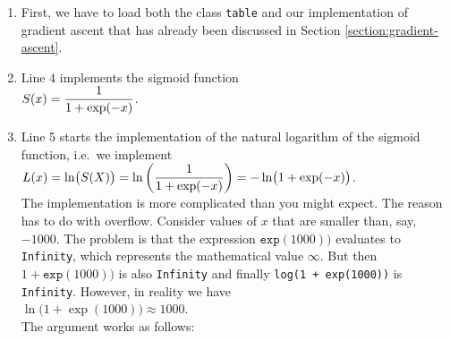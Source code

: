 \begin{enumerate}
\item First, we have to load both the class \texttt{table} and our implementation of gradient ascent 
      that has already been discussed in Section \ref{section:gradient-ascent}.
\item Line 4 implements the sigmoid function
      \\[0.2cm]
      \hspace*{1.3cm}
      $\displaystyle S(x) = \frac{1}{1 + \exp(-x)}$.
\item Line 5 starts the implementation of the natural logarithm of the sigmoid function, i.e.~we implement
      \\[0.2cm]
      \hspace*{1.3cm}
      $\displaystyle L(x) = \ln\bigl(S(X)\bigr) = \ln\left(\frac{1}{1 + \exp(-x)}\right) =- \ln\bigl(1 + \exp(-x)\bigr)$.
      \\[0.2cm]
      The implementation is more complicated than you might expect.  The reason has to do with
      overflow.  Consider values of $x$ that are smaller than, say, $-1000$.  The problem is that
      the expression $\mathtt{exp}(1000))$ evaluates to \texttt{Infinity}, which represents the
      mathematical value $\infty$.  But then $1 + \mathtt{exp}(1000))$ is also \texttt{Infinity} and
      finally \texttt{log(1 + exp(1000))} is \texttt{Infinity}.  However, in reality we have
      \\[0.2cm]
      \hspace*{1.3cm}
      $\ln\bigl(1 + \exp(1000)\bigr) \approx 1000$.
      \\[0.2cm] 
      The argument works as follows:
      \pagebreak
      \vspace*{\fill}

      \pagebreak


\end{enumerate}
